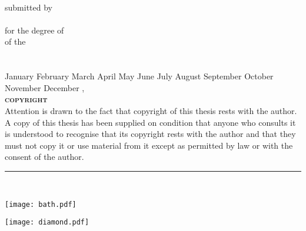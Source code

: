 \documentclass[
11pt, %
chapterinoneline,%
english, %
onehalfspacing
liststotoc, %
parskip, %
headsepline, %
]{reports/MastersDoctoralThesis} %
\author{Andrew R. McCluskey} %
\newcommand{\MONTH}{%
	\ifcase\the\month
	\or January%
	\or February%
	\or March%
	\or April%
	\or May%
	\or June%
	\or July%
	\or August%
	\or September%
	\or October%
	\or November%
	\or December%
	\fi}
\begin{document}
\frontmatter %

\pagestyle{plain} %


\begin{titlepage}
\begin{center}
\doublespacing

{\huge \bfseries \ttitle}\\
\vspace{0.4cm} %
submitted by \\
\vspace{0.1cm}
\text{\huge \authorname} \\
\vspace{0.2cm}
for the degree of \degreename \\
\vspace{0.1cm}
of the \\
\vspace{0.2cm}
{\scshape\LARGE \univname} \\
\vspace{0.1cm}
\deptname \\
\vspace{0.5cm}
\MONTH, \the\year \\
\vspace{4.cm}
{\scshape \bfseries copyright} \\
Attention is drawn to the fact that copyright of this thesis rests with the author. A copy of this thesis has been supplied on condition that anyone who consults it is understood to recognise that its copyright rests with the author and that they must not copy it or use material from it except as permitted by law or with the consent of the author. \\
\vspace{1.cm}
\doclicenseThis
\vspace{1.5cm}
\rule[0.5em]{25em}{0.5pt} \\
\vspace{1.cm}

\begin{minipage}[t][][b]{0.4\textwidth}
\begin{flushleft}
\texttt{[image: bath.pdf]}
\end{flushleft}
\end{minipage}
\begin{minipage}[t][][b]{0.4\textwidth}
\begin{flushright}
\texttt{[image: diamond.pdf]}
\end{flushright}
\end{minipage}\\[2cm]


\vfill
\end{center}
\end{titlepage}
\end{document}
